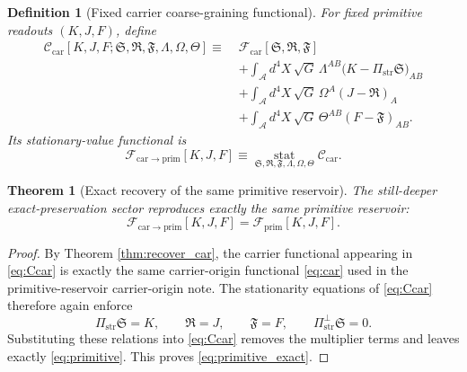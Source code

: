 \documentclass[11pt]{article}
\newcommand{\Sub}{\mathcal A}
\newcommand{\PrimFunctional}{\mathscr F_{\mathrm{prim}}}
\newcommand{\CarrierFunctional}{\mathscr F_{\mathrm{car}}}
\newcommand{\CarrierToPrim}{\mathscr F_{\mathrm{car}\to\mathrm{prim}}}
\newcommand{\PrimStrain}{K}
\newcommand{\PrimNeutral}{J}
\newcommand{\PrimFree}{F}
\newcommand{\CarrierProj}{\Pi_{\mathrm{str}}}
\newcommand{\CarrierPerp}{\Pi_{\mathrm{str}}^{\perp}}
\newcommand{\CarrierSeed}{\mathfrak S}
\newcommand{\RelabelSeed}{\mathfrak R}
\newcommand{\FreeSeed}{\mathfrak F}
\newcommand{\StrainMult}{\Lambda}
\newcommand{\NeutralMult}{\Omega}
\newcommand{\FreeMult}{\Theta}
\newtheorem{definition}{Definition}
\newtheorem{theorem}{Theorem}
\begin{document}
\begin{definition}[Fixed carrier coarse-graining functional]
\label{def:car_cg}
For fixed primitive readouts \((\PrimStrain,\PrimNeutral,\PrimFree)\), define
\begin{equation}
\begin{aligned}
\mathscr C_{\mathrm{car}}
[\PrimStrain,\PrimNeutral,\PrimFree;\CarrierSeed,\RelabelSeed,\FreeSeed,\StrainMult,\NeutralMult,\FreeMult]
\equiv\;
&\CarrierFunctional[\CarrierSeed,\RelabelSeed,\FreeSeed]
\\
&+\int_{\Sub} d^4X\,\sqrt{G}\,
\StrainMult^{AB}\bigl(\PrimStrain-\CarrierProj\CarrierSeed\bigr)_{AB}
\\
&+\int_{\Sub} d^4X\,\sqrt{G}\,
\NeutralMult^A(\PrimNeutral-\RelabelSeed)_A
\\
&+\int_{\Sub} d^4X\,\sqrt{G}\,
\FreeMult^{AB}(\PrimFree-\FreeSeed)_{AB}.
\end{aligned}
\label{eq:Ccar}
\end{equation}
Its stationary-value functional is
\begin{equation}
\CarrierToPrim[\PrimStrain,\PrimNeutral,\PrimFree]
\equiv
\operatorname*{stat}_{\CarrierSeed,\RelabelSeed,\FreeSeed,\StrainMult,\NeutralMult,\FreeMult}
\mathscr C_{\mathrm{car}}.
\label{eq:Fcarstat}
\end{equation}
\end{definition}

\begin{theorem}[Exact recovery of the same primitive reservoir]
\label{thm:recoverprimitive}
The still-deeper exact-preservation sector reproduces exactly the same primitive reservoir:
\begin{equation}
\CarrierToPrim[\PrimStrain,\PrimNeutral,\PrimFree]
=
\PrimFunctional[\PrimStrain,\PrimNeutral,\PrimFree].
\label{eq:primitive_exact}
\end{equation}
\end{theorem}

\begin{proof}
By Theorem \ref{thm:recover_car}, the carrier functional appearing in \eqref{eq:Ccar} is exactly the same carrier-origin functional \eqref{eq:car} used in the primitive-reservoir carrier-origin note. The stationarity equations of \eqref{eq:Ccar} therefore again enforce
\[
\CarrierProj\CarrierSeed=\PrimStrain,
\qquad
\RelabelSeed=\PrimNeutral,
\qquad
\FreeSeed=\PrimFree,
\qquad
\CarrierPerp\CarrierSeed=0.
\]
Substituting these relations into \eqref{eq:Ccar} removes the multiplier terms and leaves exactly \eqref{eq:primitive}. This proves \eqref{eq:primitive_exact}.
\end{proof}
\end{document}
